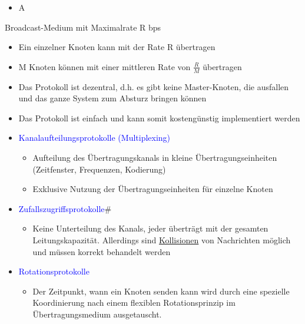 
\begin{itemize}
    \item \todo A
\end{itemize}

Broadcast-Medium mit Maximalrate R bps
\begin{itemize}
    \item Ein einzelner Knoten kann mit der Rate R übertragen
    \item M Knoten können mit einer mittleren Rate von $\frac{R}{M}$ übertragen
    \item Das Protokoll ist dezentral, d.h. es gibt keine Master-Knoten, die ausfallen und das ganze System zum Absturz bringen können
    \item Das Protokoll ist einfach und kann somit kostengünstig implementiert werden
\end{itemize}

\begin{itemize}
    \item \textcolor{blue}{Kanalaufteilungsprotokolle (Multiplexing)}
    \begin{itemize}
        \item Aufteilung des Übertragungskanals in kleine Übertragungseinheiten (Zeitfenster, Frequenzen, Kodierung)
        \item Exklusive Nutzung der Übertragungseinheiten für einzelne Knoten
    \end{itemize}
    \item \textcolor{blue}{Zufallszugriffsprotokolle}#
    \begin{itemize}
        \item Keine Unterteilung des Kanals, jeder überträgt mit der gesamten Leitungskapazität.
        Allerdings sind \underline{Kollisionen} von Nachrichten möglich und müssen korrekt behandelt werden
    \end{itemize}
    \item \textcolor{blue}{Rotationsprotokolle}
    \begin{itemize}
        \item Der Zeitpunkt, wann ein Knoten senden kann wird durch eine spezielle Koordinierung nach einem flexiblen Rotationsprinzip im Übertragungsmedium ausgetauscht.
    \end{itemize}
\end{itemize}

